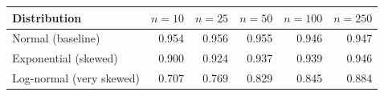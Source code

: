 \begin{tabular}{lrrrrr}
\toprule
Distribution & $n = 10$ & $n = 25$ & $n = 50$ & $n = 100$ & $n = 250$ \\
\midrule
Normal (baseline) & 0.954 & 0.956 & 0.955 & 0.946 & 0.947 \\
Exponential (skewed) & 0.900 & 0.924 & 0.937 & 0.939 & 0.946 \\
Log-normal (very skewed) & 0.707 & 0.769 & 0.829 & 0.845 & 0.884 \\
\bottomrule
\end{tabular}
